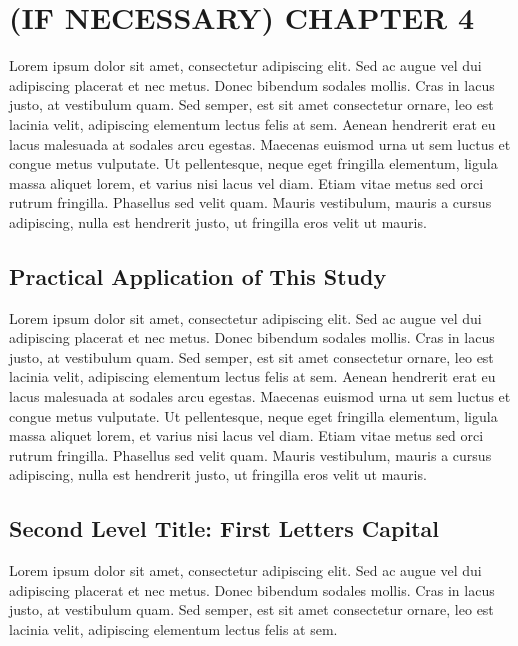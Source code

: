 \chapter{(IF NECESSARY) CHAPTER 4}\label{ch:ifnecch4}

Lorem ipsum dolor sit amet, consectetur adipiscing elit. Sed ac augue vel dui 
adipiscing placerat et nec metus. Donec bibendum sodales mollis. Cras in lacus 
justo, at vestibulum quam. Sed semper, est sit amet consectetur ornare, leo est 
lacinia velit, adipiscing elementum lectus felis at sem. Aenean hendrerit erat eu 
lacus malesuada at sodales arcu egestas. Maecenas euismod urna ut sem luctus et 
congue metus vulputate. Ut pellentesque, neque eget fringilla elementum, ligula 
massa aliquet lorem, et varius nisi lacus vel diam. Etiam vitae metus sed orci 
rutrum fringilla. Phasellus sed velit quam. Mauris vestibulum, mauris a cursus 
adipiscing, nulla est hendrerit justo, ut fringilla eros velit ut mauris.

\section{Practical Application of This Study}

Lorem ipsum dolor sit amet, consectetur adipiscing elit. Sed ac augue vel dui 
adipiscing placerat et nec metus. Donec bibendum sodales mollis. Cras in lacus 
justo, at vestibulum quam. Sed semper, est sit amet consectetur ornare, leo est 
lacinia velit, adipiscing elementum lectus felis at sem. Aenean hendrerit erat eu 
lacus malesuada at sodales arcu egestas. Maecenas euismod urna ut sem luctus et 
congue metus vulputate. Ut pellentesque, neque eget fringilla elementum, ligula 
massa aliquet lorem, et varius nisi lacus vel diam. Etiam vitae metus sed orci 
rutrum fringilla. Phasellus sed velit quam. Mauris vestibulum, mauris a cursus 
adipiscing, nulla est hendrerit justo, ut fringilla eros velit ut mauris.

\section{Second Level Title: First Letters Capital}

Lorem ipsum dolor sit amet, consectetur adipiscing elit. Sed ac augue vel dui 
adipiscing placerat et nec metus. Donec bibendum sodales mollis. Cras in lacus 
justo, at vestibulum quam. Sed semper, est sit amet consectetur ornare, leo est 
lacinia velit, adipiscing elementum lectus felis at sem. 

